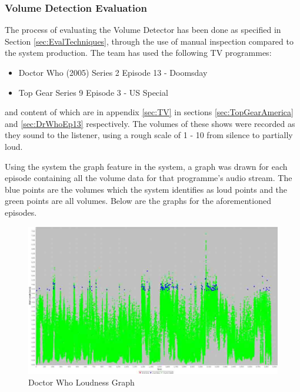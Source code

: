 \newpage
\subsubsection{Volume Detection Evaluation}
The process of evaluating the Volume Detector has been done as specified in Section \ref{sec:EvalTechniques}, through the use of manual inspection compared to the system production. The team has used the following TV programmes:
\begin{itemize}
	\item{Doctor Who (2005) Series 2 Episode 13 -  Doomsday}
	\item{Top Gear Series 9 Episode 3 - US Special}
\end{itemize}

and content of which are in appendix \ref{sec:TV} in sections \ref{sec:TopGearAmerica} and \ref{sec:DrWhoEp13} respectively. The volumes of these shows were recorded as they sound to the listener, using a rough scale of 1 - 10 from silence to partially loud.

Using the system the graph feature in the system, a graph was drawn for each episode containing all the volume data for that programme’s audio stream. The blue points are the volumes which the system identifies as loud points and the green points are all volumes. Below are the graphs for the aforementioned episodes. 

\begin{figure}[h1]
\begin{center}
\includegraphics[trim = 0mm 0mm 0mm 0mm, clip, scale=0.35]{Images/doctor_who_loudness_graph.jpg}
\caption{Doctor Who Loudness Graph}
\end{center}
\end{figure}

